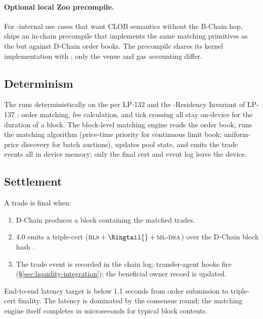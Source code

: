 \paragraph{Optional local Zoo \DEX{} precompile.}
For \Zoo{}-internal use cases that want CLOB semantics without the
B-Chain hop, \Zoo{} ships an in-chain \DEX{} precompile that
implements the same matching primitives as the \Lux{} \DEX{} but
against \Zoo{} D-Chain order books. The precompile shares its kernel
implementation with \Lux{} \DEX{}; only the venue and gas accounting
differ.

\subsection{Determinism}

The \DEX{} runs deterministically on the \GPU{} per LP-132
\cite{lp-132} and the \GPU{}-Residency Invariant of LP-137
\cite{lp-137}: order matching, fee calculation, and tick crossing
all stay on-device for the duration of a block. The block-level
matching engine reads the order book, runs the matching algorithm
(price-time priority for continuous limit book; uniform-price
discovery for batch auctions), updates pool state, and emits the
trade events all in device memory; only the final cert and event
log leave the device.

\subsection{Settlement}

A trade is final when:

\begin{enumerate}[leftmargin=1.4em]
  \item \Zoo{} D-Chain produces a block containing the matched trades.
  \item \Lux{} \Quasar{} 4.0 emits a triple-cert
        ($\BLS{} + \Ringtail{} + \MLDSA{}$) over the D-Chain block hash
        \cite{lp-020}.
  \item The trade event is recorded in the chain log; transfer-agent
        hooks fire (\S\ref{sec:liquidity-integration}); the
        beneficial owner record is updated.
\end{enumerate}

End-to-end latency target is below 1.1 seconds from order submission
to triple-cert finality. The latency is dominated by the consensus
round; the matching engine itself completes in microseconds for
typical block contents.

